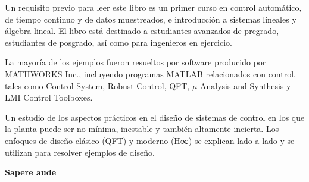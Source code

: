 \documentclass[
	spanish, %
	letterpaper, oneside
]{book}
\begin{document}
\begin{abstractd}
	Un requisito previo para leer este libro es un primer curso en control automático, de tiempo continuo y de datos muestreados, e introducción a sistemas lineales y álgebra lineal. El libro está destinado a estudiantes avanzados de pregrado, estudiantes de posgrado, así como para ingenieros en ejercicio.

	La mayoría de los ejemplos fueron resueltos por software producido por MATHWORKS Inc., incluyendo programas MATLAB relacionados con control, tales como Control System, Robust Control, QFT, $\mu$-Analysis and Synthesis y LMI Control Toolboxes.
\end{abstractd}

\begin{dedicatory}
	Un estudio de los aspectos prácticos en el diseño de sistemas de control en los que la planta puede ser no mínima, inestable y también altamente incierta. Los enfoques de diseño clásico (QFT) y moderno (H∞) se explican lado a lado y se utilizan para resolver ejemplos de diseño.

	\textbf{Sapere aude}
\end{dedicatory}


\templateIndex

\templateFinalcfg





\end{document}
